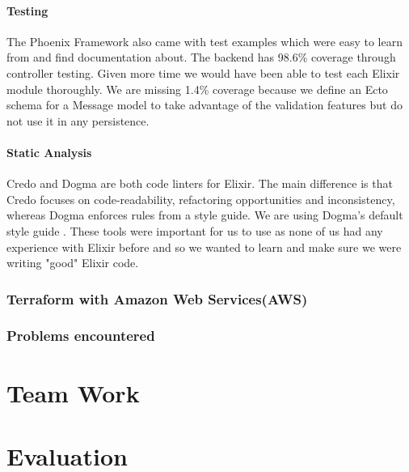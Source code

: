 \documentclass[11pt,a4paper]{report}
\begin{document}
\subsubsection{Testing}

The Phoenix Framework also came with test examples which were easy to learn from and find documentation about. The backend has 98.6\% coverage through controller testing. Given more time we would have been able to test each Elixir module thoroughly. We are missing 1.4\% coverage because we define an Ecto schema for a Message model to take advantage of the validation features but do not use it in any persistence.

\subsubsection{Static Analysis}

Credo and Dogma are both code linters for Elixir. The main difference is that Credo focuses on code-readability, refactoring opportunities and inconsistency, whereas Dogma enforces rules from a style guide. We are using Dogma's default style guide \cite{website:elixir_dogma_rules}. These tools were important for us to use as none of us had any experience with Elixir before and so we wanted to learn and make sure we were writing "good" Elixir code.

\subsection{Terraform with Amazon Web Services(AWS)}



\subsection{Problems encountered}





\chapter{Team Work}

\chapter{Evaluation}

\end{document}
